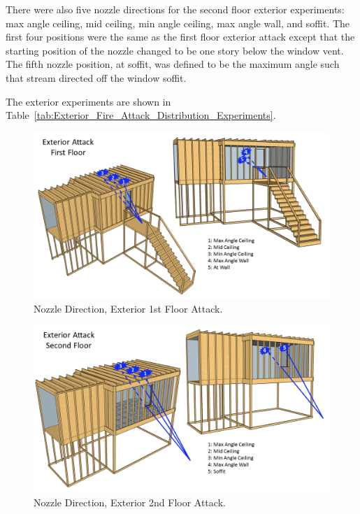 \documentclass[12pt,oneside]{book}
\begin{document}
There were also five nozzle directions for the second floor exterior experiments: max angle ceiling, mid ceiling, min angle ceiling, max angle wall, and soffit. The first four positions were the same as the first floor exterior attack except that the starting position of the nozzle changed to be one story below the window vent. The fifth nozzle position, at soffit, was defined to be the maximum angle such that stream directed off the window soffit.

The exterior experiments are shown in Table~\ref{tab:Exterior_Fire_Attack_Distribution_Experiments}.

\begin{figure}[!ht]
	\centering
	\includegraphics[width=\columnwidth]{Figures/Water_Distribution/Nozzle_Position_ExtFirstfloor}
	\caption[Nozzle Direction, Exterior 1st Floor Attack]{Nozzle Direction, Exterior 1st Floor Attack.}
	\label{fig:Nozzle_Direction_Exterior_1st_Floor_Attack}
\end{figure}

\begin{figure}[!ht]
	\centering
	\includegraphics[width=\columnwidth]{Figures/Water_Distribution/Nozzle_Position_ExtSecondfloor}
	\caption[Nozzle Direction, Exterior 2nd Floor Attack]{Nozzle Direction, Exterior 2nd Floor Attack.}
	\label{fig:Nozzle_Direction_Exterior_2nd_Floor_Attack}
\end{figure}
\end{document}
